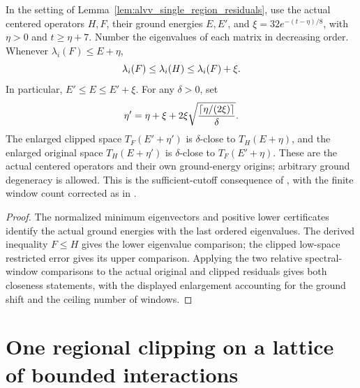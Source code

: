 \begin{lemma}
    \label{lem:alvv_single_region_spectral_comparison}
    \leanok
    In the setting of Lemma~\ref{lem:alvv_single_region_residuals}, use the
    actual centered operators $H,F$, their ground energies $E,E'$, and
    $\xi=32e^{-(t-\eta)/8}$, with $\eta>0$ and $t\ge\eta+7$.
    Number the eigenvalues of each matrix in decreasing order. Whenever
    $\lambda_i(F)\le E+\eta$,
    \begin{equation}
        \lambda_i(F)\le\lambda_i(H)\le\lambda_i(F)+\xi.\notag
    \end{equation}
    In particular, $E'\le E\le E'+\xi$.
    For any $\delta>0$, set
    \begin{equation}
        \eta'=\eta+\xi+2\xi
        \sqrt{\frac{\lceil\eta/(2\xi)\rceil}{\delta}}.\notag
    \end{equation}
    The enlarged clipped space $T_F(E'+\eta')$ is $\delta$-close to
    $T_H(E+\eta)$, and the enlarged original space $T_H(E+\eta')$ is
    $\delta$-close to $T_F(E'+\eta)$.
    These are the actual centered operators and their own ground-energy
    origins; arbitrary ground degeneracy is allowed. This is the
    sufficient-cutoff consequence of
    \cite[Proposition~4.4 and Lemma~4.5]{Arad2016RigorousRG}, with the
    finite window count corrected as in
    \cite{gap:alvv16_hard_truncation_windows}.
\end{lemma}
\begin{proof}\leanok
    The normalized minimum eigenvectors and positive lower certificates
    identify the actual ground energies with the last ordered eigenvalues.
    The derived inequality $F\le H$ gives the lower eigenvalue comparison;
    the clipped low-space restricted error gives its upper comparison.
    Applying the two relative spectral-window comparisons to the actual
    original and clipped residuals gives both closeness statements, with
    the displayed enlargement accounting for the ground shift and the
    ceiling number of windows.
\end{proof}

\section{One regional clipping on a lattice of bounded interactions}

